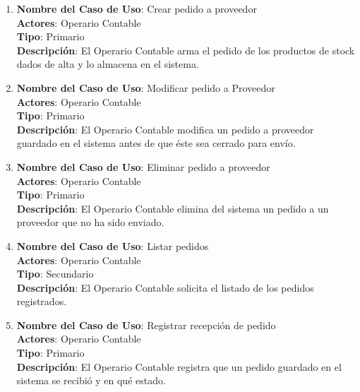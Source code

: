 \documentclass[12pt]{extarticle}
\begin{document}
\begin{spacing}{1.2}
\begin{enumerate}
            \item 	\textbf{Nombre del Caso de Uso}: Crear pedido a proveedor\\
                    \textbf{Actores}: Operario Contable\\
                    \textbf{Tipo}: Primario\\
                    \textbf{Descripción}: El Operario Contable arma el pedido de los productos de stock dados de alta y lo almacena en el sistema.

            \item 	\textbf{Nombre del Caso de Uso}: Modificar pedido a Proveedor\\
                    \textbf{Actores}: Operario Contable\\
                    \textbf{Tipo}: Primario\\
                    \textbf{Descripción}: El Operario Contable modifica un pedido a proveedor guardado en el sistema antes de que éste sea cerrado para envío.

            \item 	\textbf{Nombre del Caso de Uso}: Eliminar pedido a proveedor\\
                    \textbf{Actores}: Operario Contable\\
                    \textbf{Tipo}: Primario\\
                    \textbf{Descripción}: El Operario Contable elimina del sistema un pedido a un proveedor que no ha sido enviado.


            \item 	\textbf{Nombre del Caso de Uso}: Listar pedidos \\
                    \textbf{Actores}: Operario Contable\\
                    \textbf{Tipo}: Secundario\\
                    \textbf{Descripción}: El Operario Contable solicita el listado de los pedidos registrados.

            \item 	\textbf{Nombre del Caso de Uso}: Registrar recepción de pedido\\
                    \textbf{Actores}: Operario Contable\\
                    \textbf{Tipo}: Primario\\
                    \textbf{Descripción}: El Operario Contable registra que un pedido guardado en el sistema se recibió y en qué estado. 


\end{enumerate}
\end{spacing}
\end{document}
